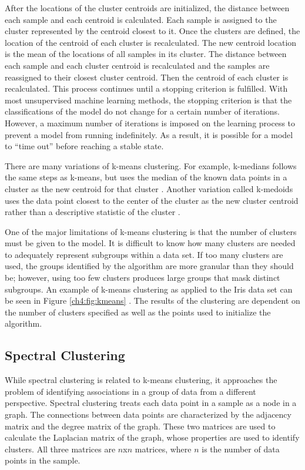 After the locations of the cluster centroids are initialized, the distance between each sample and each centroid is calculated. Each sample is assigned to the cluster represented by the centroid closest to it. Once the clusters are defined, the location of the centroid of each cluster is recalculated. The new centroid location is the mean of the locations of all samples in its cluster. The distance between each sample and each cluster centroid is recalculated and the samples are reassigned to their closest cluster centroid. Then the centroid of each cluster is recalculated. This process continues until a stopping criterion is fulfilled. With most unsupervised machine learning methods, the stopping criterion is that the classifications of the model do not change for a certain number of iterations. However, a maximum number of iterations is imposed on the learning process to prevent a model from running indefinitely. As a result, it is possible for a model to ``time out'' before reaching a stable state.

There are many variations of k-means clustering. For example, k-medians follows the same steps as k-means, but uses the median of the known data points in a cluster as the new centroid for that cluster \cite{Juan1998}. Another variation called k-medoids uses the data point closest to the center of the cluster as the new cluster centroid rather than a descriptive statistic of the cluster \cite{Kaufman1987}.

One of the major limitations of k-means clustering is that the number of clusters must be given to the model. It is difficult to know how many clusters are needed to adequately represent subgroups within a data set. If too many clusters are used, the groups identified by the algorithm are more granular than they should be; however, using too few clusters produces large groups that mask distinct subgroups. An example of k-means clustering as applied to the Iris data set can be seen in Figure \ref{ch4:fig:kmeans} \cite{Varoquaux2019}. The results of the clustering are dependent on the number of clusters specified as well as the points used to initialize the algorithm.


\subsection{Spectral Clustering}

While spectral clustering is related to k-means clustering, it approaches the problem of identifying associations in a group of data from a different perspective. Spectral clustering treats each data point in a sample as a node in a graph. The connections between data points are characterized by the adjacency matrix and the degree matrix of the graph. These two matrices are used to calculate the Laplacian matrix of the graph, whose properties are used to identify clusters. All three matrices are $n$x$n$ matrices, where $n$ is the number of data points in the sample. 

